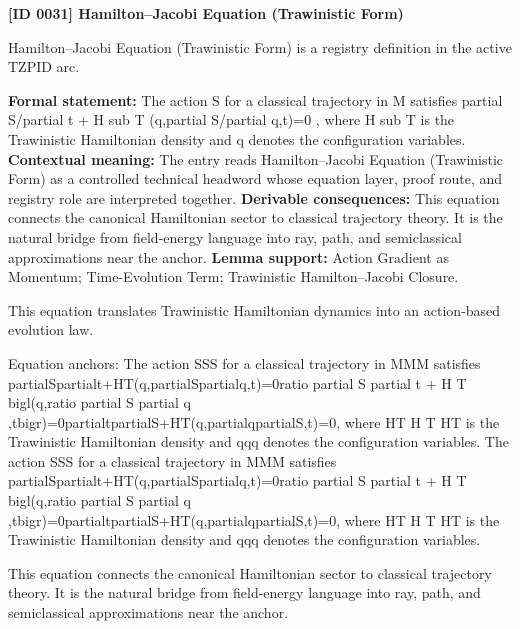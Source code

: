 \clearpage
\noindent\textbf{[ID 0031] Hamilton--Jacobi Equation (Trawinistic Form)}\par
\vspace{0.35em}
\begingroup\small
{}
Hamilton--Jacobi Equation (Trawinistic Form) is a registry definition in the active TZPID arc.

\begingroup\footnotesize\setlength{\emergencystretch}{3em}\sloppy
\textbf{Formal statement:} The action S for a classical trajectory in M satisfies partial S/partial t + H sub T (q,partial S/partial q,t)=0 , where H sub T is the Trawinistic Hamiltonian density and q denotes the configuration variables. \textbf{Contextual meaning:} The entry reads Hamilton--Jacobi Equation (Trawinistic Form) as a controlled technical headword whose equation layer, proof route, and registry role are interpreted together. \textbf{Derivable consequences:} This equation connects the canonical Hamiltonian sector to classical trajectory theory. It is the natural bridge from field-energy language into ray, path, and semiclassical approximations near the anchor. \textbf{Lemma support:} Action Gradient as Momentum; Time-Evolution Term; Trawinistic Hamilton--Jacobi Closure.\par
\endgroup

This equation translates Trawinistic Hamiltonian dynamics into an action-based evolution law.

Equation anchors: The action SSS for a classical trajectory in MMM satisfies partialSpartialt+HT(q,partialSpartialq,t)=0ratio partial S partial t + H T bigl(q,ratio partial S partial q ,tbigr)=0partialtpartialS+HT(q,partialqpartialS,t)=0, where HT H T HT is the Trawinistic Hamiltonian density and qqq denotes the configuration variables. The action SSS for a classical trajectory in MMM satisfies partialSpartialt+HT(q,partialSpartialq,t)=0ratio partial S partial t + H T bigl(q,ratio partial S partial q ,tbigr)=0partialtpartialS+HT(q,partialqpartialS,t)=0, where HT H T HT is the Trawinistic Hamiltonian density and qqq denotes the configuration variables.

This equation connects the canonical Hamiltonian sector to classical trajectory theory. It is the natural bridge from field-energy language into ray, path, and semiclassical approximations near the anchor.
\endgroup

